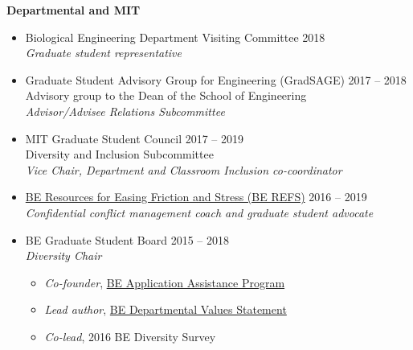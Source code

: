 \documentclass[10pt]{article}
\newenvironment{outerlist}[1][\enskip\textbullet]%
        {\begin{itemize}[#1,leftmargin=*]}{\end{itemize}%
         \vspace{-.6\baselineskip}}
\newenvironment{innerlist}[1][\enskip\textbullet]%
        {\begin{itemize}[#1,leftmargin=*,parsep=0pt,itemsep=0pt,topsep=0pt,partopsep=0pt]}
        {\end{itemize}}
\begin{document}
\textbf{Departmental and MIT}
\begin{outerlist}
	\item[] Biological Engineering Department Visiting Committee \hfill {2018} \\
	\textit{Graduate student representative}
	\item[] Graduate Student Advisory Group for Engineering (GradSAGE) \hfill {2017 -- 2018} \\
	Advisory group to the Dean of the School of Engineering \\
	\textit{Advisor/Advisee Relations Subcommittee}
	\item[] MIT Graduate Student Council \hfill {2017 -- 2019} \\
		Diversity and Inclusion Subcommittee  \\
		\textit{Vice Chair, Department and Classroom Inclusion co-coordinator} 
	\item[] \href{http://berefs.com/}{BE Resources for Easing Friction and Stress (BE REFS)} \hfill {2016 -- 2019} \\
	\textit{Confidential conflict management coach and graduate student advocate} \\

	
	\item[] BE Graduate Student Board \hfill {2015 -- 2018} \\ 
		\textit{Diversity Chair}
		\begin{innerlist}
			\item[] \textit{Co-founder}, \href{http://be.mit.edu/academic-programs/prospective-graduate/beaap}{BE Application Assistance Program} 
			\item[] \textit{Lead author}, \href{http://be.mit.edu/about/department-values-statement}{BE Departmental Values Statement}
			\item[] \textit{Co-lead}, 2016 BE Diversity Survey
		\end{innerlist}
\end{outerlist}
\vspace{.15in}
\end{document}
